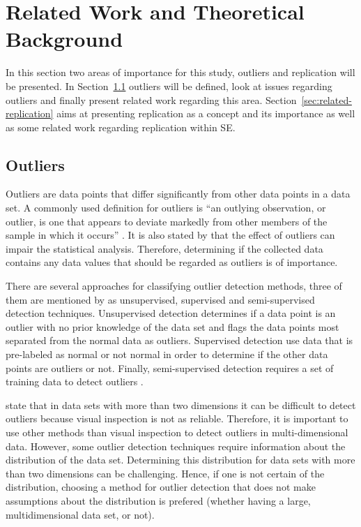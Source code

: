 ﻿\section{Related Work and Theoretical Background}
\label{sec:relatedwork}
In this section two areas of importance for this study, outliers and replication will be presented. In Section~\ref{sec:related-outliers} outliers will be defined, look at issues regarding outliers and finally present related work regarding this area. Section~\ref{sec:related-replication} aims at presenting replication as a concept and its importance as well as some related work regarding replication within SE\@.




\subsection{Outliers}
\label{sec:related-outliers}
Outliers are data points that differ significantly from other data points in a data set. A commonly used definition for outliers is ``an outlying observation, or outlier, is one that appears to deviate markedly from other members of the sample in which it occurs'' \citep{osborne2004power}. It is also stated by \citet{osborne2004power} that the effect of outliers can impair the statistical analysis. Therefore, determining if the collected data contains any data values that should be regarded as outliers is of importance. 




There are several approaches for classifying outlier detection methods, three of them are mentioned by \citet{hodge2004survey} as unsupervised, supervised and semi-supervised detection techniques. Unsupervised detection determines if a data point is an outlier with no prior knowledge of the data set and flags the data points most separated from the normal data as outliers. Supervised detection use data that is pre-labeled as normal or not normal in order to determine if the other data points are outliers or not. Finally, semi-supervised detection requires a set of training data to detect outliers \citep{hodge2004survey}.  




\citet{rousseeuw1990unmasking} state that in data sets with more than two dimensions it can be difficult to detect outliers because visual inspection is not as reliable. Therefore, it is important to use other methods than visual inspection to detect outliers in multi-dimensional data. However, some outlier detection techniques require information about the distribution of the data set. Determining this distribution for data sets with more than two dimensions can be challenging. Hence, if one is not certain of the distribution, choosing a method for outlier detection that does not make assumptions about the distribution is prefered (whether having a large, multidimensional data set, or not).




